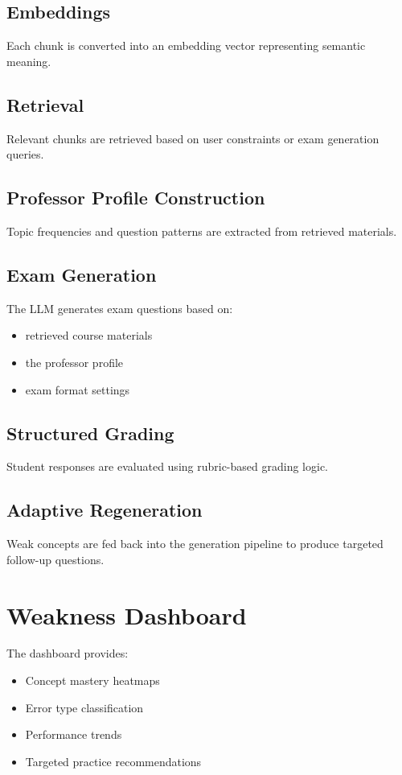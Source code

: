 \documentclass[11pt]{article}
\begin{document}
\subsection{Embeddings}
Each chunk is converted into an embedding vector representing semantic meaning.

\subsection{Retrieval}
Relevant chunks are retrieved based on user constraints or exam generation queries.

\subsection{Professor Profile Construction}
Topic frequencies and question patterns are extracted from retrieved materials.

\subsection{Exam Generation}
The LLM generates exam questions based on:
\begin{itemize}
\item retrieved course materials
\item the professor profile
\item exam format settings
\end{itemize}

\subsection{Structured Grading}
Student responses are evaluated using rubric-based grading logic.

\subsection{Adaptive Regeneration}
Weak concepts are fed back into the generation pipeline to produce targeted follow-up questions.

\section{Weakness Dashboard}
The dashboard provides:

\begin{itemize}
\item Concept mastery heatmaps
\item Error type classification
\item Performance trends
\item Targeted practice recommendations
\end{itemize}
\end{document}
